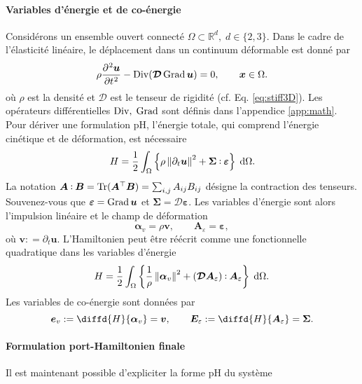 \paragraph{Variables d'énergie et de co-énergie}
Considérons un ensemble ouvert connecté $\Omega \subset \mathbb{R}^d, \; d \in \{2,3 \} $. Dans le cadre de l'élasticité linéaire, le déplacement dans un continuum déformable est donné par
\begin{equation*}
\rho \diffp[2]{\bm{u}}{t} - \Div(\bm{\mathcal{D}} \Grad \bm{u}) = 0, \qquad \bm{x} \in \Omega.
\end{equation*}
où $\rho$ est la densité et $\bm{\mathcal{D}}$ est le tenseur de rigidité (cf. Eq. \ref{eq:stiff3D}). Les opérateurs différentielles $\operatorname*{Div}, \; \operatorname*{Grad}$ sont définis dans l'appendice \ref{app:math}. Pour dériver une formulation pH, l'énergie totale, qui comprend l'énergie cinétique et de déformation, est nécessaire
\begin{equation*}
	H = \energy {\rho \norm{\partial_t \bm{u}}^2 + \bm{\Sigma} \cddot \bm{\varepsilon}}.
\end{equation*}
La notation $ \bm{A} \cddot \bm{B} = \Tr (\bm{A}^\top \bm{B}) = \sum_{i, j} A_{ij} B_{ij} $ désigne la contraction des tenseurs. Souvenez-vous que $\bm{\varepsilon} = \operatorname*{Grad} {\bm{u}} $ et $ \bm{\Sigma} = \bm{\mathcal{D}} \bm{\varepsilon}$. Les variables d'énergie sont alors l'impulsion linéaire et le champ de déformation
\begin{equation*}
\bm{\alpha}_v = \rho \bm{v}, \qquad \bm{A}_{\varepsilon} = \bm{\varepsilon},
\end{equation*}
où $ \bm{v}: = \partial_t \bm{u}$. L'Hamiltonien peut être réécrit comme une fonctionnelle quadratique dans les variables d'énergie
\begin{equation*}
H = \energy{\frac{1}{\rho} \norm{\bm{\alpha}_v}^2 + (\bm{\mathcal{D}} \bm{A}_{\varepsilon}) \cddot \bm{A}_{\varepsilon}}.
\end{equation*}
Les variables de co-énergie sont données par
\begin{equation*}
\bm{e}_v: = \diffd{H}{\bm{\alpha}_v} = \bm{v}, \qquad \bm{E}_\varepsilon: = \diffd{H}{\bm{A}_{\varepsilon}} = \bm{\Sigma}.
\end{equation*}

\paragraph{Formulation port-Hamiltonien finale}
Il est maintenant possible d'expliciter la forme pH du système


